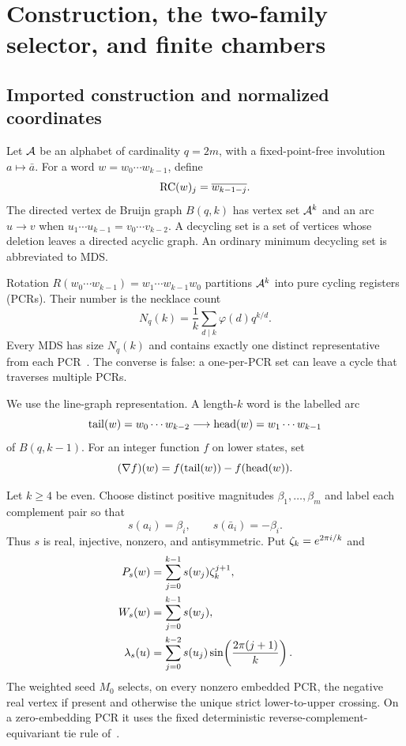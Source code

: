 \section{Construction, the two-family selector, and finite chambers}

\subsection{Imported construction and normalized coordinates}
\label{sec:base}

Let $\mathcal A$ be an alphabet of cardinality $q=2m$, with a fixed-point-free
involution $a\mapsto\bar a$.  For a word $w=w_0\cdots w_{k-1}$, define
\[
  \operatorname{RC}(w)_j=\overline{w_{k-1-j}}.
\]
The directed vertex de Bruijn graph $B(q,k)$ has vertex set $\mathcal A^k$ and an arc
$u\to v$ when $u_1\cdots u_{k-1}=v_0\cdots v_{k-2}$.  A decycling set is a
set of vertices whose deletion leaves a directed acyclic graph.  An ordinary
minimum decycling set is abbreviated to MDS.

Rotation $R(w_0\cdots w_{k-1})=w_1\cdots w_{k-1}w_0$ partitions $\mathcal A^k$ into
pure cycling registers (PCRs).  Their number is the necklace count
\begin{equation}
  N_q(k)=\frac1k\sum_{d\mid k}\varphi(d)q^{k/d}.
  \label{eq:necklace-count}
\end{equation}
Every MDS has size $N_q(k)$ and contains exactly one distinct representative
from each PCR~\cite{Mykkeltveit1972,ChamparnaudHanselPerrin2004}.  The converse
is false: a one-per-PCR set can leave a cycle that traverses multiple PCRs.

We use the line-graph representation.  A length-$k$ word is the labelled arc
\[
  \operatorname{tail}(w)=w_0\cdots w_{k-2}\longrightarrow
  \operatorname{head}(w)=w_1\cdots w_{k-1}
\]
of $B(q,k-1)$.  For an integer function $f$ on lower states, set
\begin{equation}
  (\nabla f)(w)=f(\operatorname{tail}(w))-f(\operatorname{head}(w)).
  \label{eq:gradient}
\end{equation}

Let $k\ge4$ be even.  Choose distinct positive magnitudes
$\beta_1,\ldots,\beta_m$ and label each complement pair so that
\[
  s(a_i)=\beta_i,\qquad s(\bar a_i)=-\beta_i.
\]
Thus $s$ is real, injective, nonzero, and antisymmetric.  Put
$\zeta_k=e^{2\pi i/k}$ and
\begin{align}
  P_s(w)&=\sum_{j=0}^{k-1}s(w_j)\zeta_k^{j+1},                            \label{eq:embedding}\\
  W_s(w)&=\sum_{j=0}^{k-1}s(w_j),                                        \label{eq:weight-sum}\\
  \lambda_s(u)&=\sum_{j=0}^{k-2}s(u_j)
       \sin\!\left(\frac{2\pi(j+1)}k\right).                            \label{eq:lambda}
\end{align}
The weighted seed $M_0$ selects, on every nonzero embedded PCR, the negative
real vertex if present and otherwise the unique strict lower-to-upper
crossing.  On a zero-embedding PCR it uses the fixed deterministic
reverse-complement-equivariant tie rule of~\cite{Babanskyy2026Parity}.

